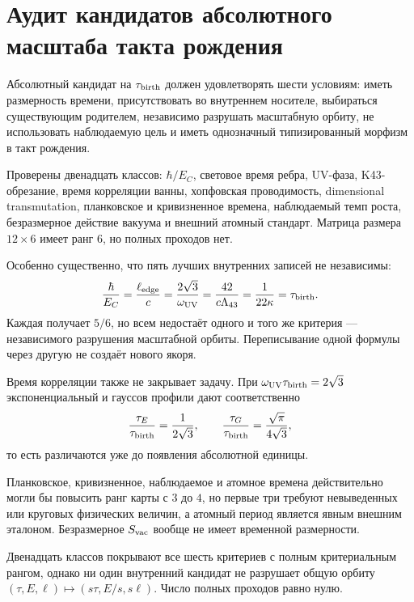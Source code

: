 \chapter{Аудит кандидатов абсолютного масштаба такта рождения}
\label{ch:v10-nonequilibrium-bath-birth-tick-scale-audit}

Абсолютный кандидат на $\tau_{\rm birth}$ должен удовлетворять шести
условиям: иметь размерность времени, присутствовать во внутреннем носителе,
выбираться существующим родителем, независимо разрушать масштабную орбиту,
не использовать наблюдаемую цель и иметь однозначный типизированный морфизм
в такт рождения.

Проверены двенадцать классов: $\hbar/E_C$, световое время ребра,
UV-фаза, K43-обрезание, время корреляции ванны, хопфовская проводимость,
dimensional transmutation, планковское и кривизненное времена, наблюдаемый
темп роста, безразмерное действие вакуума и внешний атомный стандарт.
Матрица размера $12\times6$ имеет ранг $6$, но полных проходов нет.

Особенно существенно, что пять лучших внутренних записей не независимы:
\begin{equation}
 \frac{\hbar}{E_C}
 =\frac{\ell_{\rm edge}}c
 =\frac{2\sqrt3}{\omega_{\rm UV}}
 =\frac{42}{c\Lambda_{43}}
 =\frac1{22\kappa}
 =\tau_{\rm birth}.
\end{equation}
Каждая получает $5/6$, но всем недостаёт одного и того же критерия ---
независимого разрушения масштабной орбиты. Переписывание одной формулы через
другую не создаёт нового якоря.

Время корреляции также не закрывает задачу. При
$\omega_{\rm UV}\tau_{\rm birth}=2\sqrt3$ экспоненциальный и гауссов
профили дают соответственно
\begin{equation}
 \frac{\tau_E}{\tau_{\rm birth}}=\frac1{2\sqrt3},
 \qquad
 \frac{\tau_G}{\tau_{\rm birth}}=\frac{\sqrt\pi}{4\sqrt3},
\end{equation}
то есть различаются уже до появления абсолютной единицы.

Планковское, кривизненное, наблюдаемое и атомное времена действительно могли
бы повысить ранг карты с $3$ до $4$, но первые три требуют невыведенных или
круговых физических величин, а атомный период является явным внешним
эталоном. Безразмерное $S_{\rm vac}$ вообще не имеет временной размерности.

\begin{theorem}
Двенадцать классов покрывают все шесть критериев с полным критериальным
рангом, однако ни один внутренний кандидат не разрушает общую орбиту
$(\tau,E,\ell)\mapsto(s\tau,E/s,s\ell)$. Число полных проходов равно нулю.
\end{theorem}

